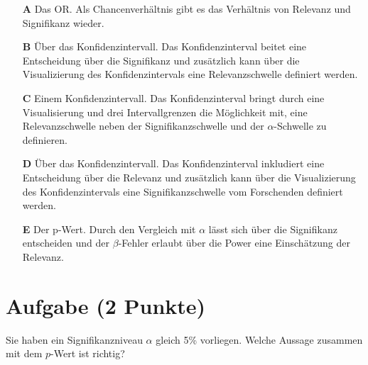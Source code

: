 \documentclass[a4paper, 9pt]{scrartcl}\usepackage[]{graphicx}\usepackage[]{xcolor}
\begin{document}
\begin{enumerate}
\item [\textbf{A} \msquare] Das OR. Als Chancenverhältnis gibt es das Verhältnis von Relevanz und Signifikanz wieder.
\item [\textbf{B} \msquare] Über das Konfidenzintervall. Das Konfidenzinterval beitet eine Entscheidung über die Signifikanz und zusätzlich kann über die Visualizierung des Konfidenzintervals eine Relevanzschwelle definiert werden.
\item [\textbf{C} \msquare] Einem Konfidenzintervall. Das Konfidenzinterval bringt durch eine Visualisierung und drei Intervallgrenzen die Möglichkeit mit, eine Relevanzschwelle neben der Signifikanzschwelle und der $\alpha$-Schwelle zu definieren.
\item [\textbf{D} \msquare] Über das Konfidenzintervall. Das Konfidenzinterval inkludiert eine Entscheidung über die Relevanz und zusätzlich kann über die Visualizierung des Konfidenzintervals eine Signifikanzschwelle vom Forschenden definiert werden.
\item [\textbf{E} \msquare] Der p-Wert. Durch den Vergleich mit $\alpha$ lässt sich über die Signifikanz entscheiden und der $\beta$-Fehler erlaubt über die Power eine Einschätzung der Relevanz.
\end{enumerate}

\section{Aufgabe \hfill (2 Punkte)}



Sie haben ein Signifikanzniveau $\alpha$ gleich 5\% vorliegen. Welche Aussage zusammen mit dem $p$-Wert ist richtig?
\end{document}
